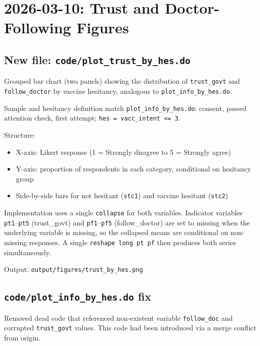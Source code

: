 
\section{2026-03-10: Trust and Doctor-Following Figures}

\subsection{New file: \texttt{code/plot\_trust\_by\_hes.do}}

Grouped bar chart (two panels) showing the distribution of \texttt{trust\_govt} and
\texttt{follow\_doctor} by vaccine hesitancy, analogous to \texttt{plot\_info\_by\_hes.do}.

Sample and hesitancy definition match \texttt{plot\_info\_by\_hes.do}: consent, passed
attention check, first attempt; \texttt{hes = vacc\_intent <= 3}.

Structure:
\begin{itemize}
    \item X-axis: Likert response (1 = Strongly disagree to 5 = Strongly agree)
    \item Y-axis: proportion of respondents in each category, conditional on hesitancy group
    \item Side-by-side bars for not hesitant (\texttt{stc1}) and vaccine hesitant (\texttt{stc2})
\end{itemize}

Implementation uses a single \texttt{collapse} for both variables. Indicator variables
\texttt{pt1}--\texttt{pt5} (trust\_govt) and \texttt{pf1}--\texttt{pf5} (follow\_doctor)
are set to missing when the underlying variable is missing, so the collapsed means
are conditional on non-missing responses. A single \texttt{reshape long pt pf} then
produces both series simultaneously.

Output: \texttt{output/figures/trust\_by\_hes.png}

\subsection{\texttt{code/plot\_info\_by\_hes.do} fix}

Removed dead code that referenced non-existent variable \texttt{follow\_doc} and
corrupted \texttt{trust\_govt} values. This code had been introduced via a merge
conflict from origin.
